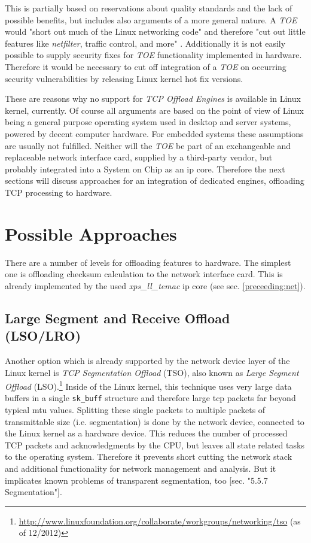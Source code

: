 This is partially based on reservations about quality standards and the lack of possible benefits, but includes also arguments of a more general nature. A \textit{TOE} would "short out much of the Linux networking code" and therefore "cut out little features like \textit{netfilter}, traffic control, and more" \cite{linux-toe}. Additionally it is not easily possible to supply security fixes for \textit{TOE} functionality implemented in hardware. Therefore it would be necessary to cut off integration of a \textit{TOE} on occurring security vulnerabilities by releasing Linux kernel hot fix versions.

These are reasons why no support for \textit{TCP Offload Engines} is available in Linux kernel, currently. Of course all arguments are based on the point of view of Linux being a general purpose operating system used in desktop and server systems, powered by decent computer hardware. For embedded systems these assumptions are usually not fulfilled. Neither will the \textit{TOE} be part of an exchangeable and replaceable network interface card, supplied by a third-party vendor, but probably integrated into a System on Chip as an \gls{ip} core. Therefore the next sections will discuss approaches for an integration of dedicated engines, offloading TCP processing to hardware.
\\

\section{Possible Approaches}

There are a number of levels for offloading features to hardware. The simplest one is offloading checksum calculation to the network interface card. This is already implemented by the used \textit{xps\_ll\_temac} \gls{ip} core (see sec. \ref{preceeding:net}).
\\

\subsection{Large Segment and Receive Offload (LSO/LRO)}

Another option which is already supported by the network device layer of the Linux kernel is \textit{TCP Segmentation Offload} (TSO), also known as \textit{Large Segment Offload} (LSO).\footnote{\url{http://www.linuxfoundation.org/collaborate/workgroups/networking/tso} (as of 12/2012)} Inside of the Linux kernel, this technique uses very large data buffers in a single \texttt{sk\_buff} structure and therefore large \gls{tcp} packets far beyond typical \gls{mtu} values. Splitting these single packets to multiple packets of transmittable size (i.e. segmentation) is done by the network device, connected to the Linux kernel as a hardware device. This reduces the number of processed TCP packets and acknowledgments by the CPU, but leaves all state related tasks to the operating system. Therefore it prevents short cutting the network stack and additional functionality for network management and analysis. But it implicates known problems of transparent segmentation, too \cite{kn1}[sec. "5.5.7 Segmentation"].


